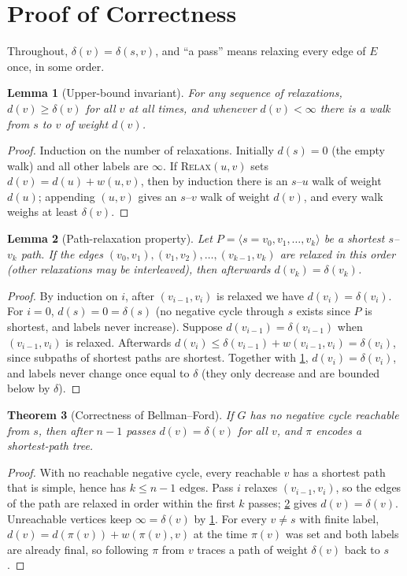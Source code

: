 \documentclass[11pt,a4paper]{article}
\newtheorem{theorem}{Theorem}
\newtheorem{lemma}[theorem]{Lemma}
\theoremstyle{definition}
\newcommand{\dd}{\mathit{d}}
\newcommand{\pred}{\pi}
\begin{document}
\section{Proof of Correctness}
\label{sec:proofs}

Throughout, $\delta(v)=\delta(s,v)$, and ``a pass'' means relaxing every edge of $E$ once, in some order.

\begin{lemma}[Upper-bound invariant]\label{lem:upper}
For any sequence of relaxations, $\dd(v)\ge\delta(v)$ for all $v$ at all times, and whenever $\dd(v)<\infty$ there is a walk from $s$ to $v$ of weight $\dd(v)$.
\end{lemma}
\begin{proof}
Induction on the number of relaxations. Initially $\dd(s)=0$ (the empty walk) and all other labels are $\infty$. If \textsc{Relax}$(u,v)$ sets $\dd(v)=\dd(u)+w(u,v)$, then by induction there is an $s$--$u$ walk of weight $\dd(u)$; appending $(u,v)$ gives an $s$--$v$ walk of weight $\dd(v)$, and every walk weighs at least $\delta(v)$.
\end{proof}

\begin{lemma}[Path-relaxation property]\label{lem:pathrelax}
Let $P=\langle s=v_0,v_1,\dots,v_k\rangle$ be a shortest $s$--$v_k$ path. If the edges $(v_0,v_1),(v_1,v_2),\dots,(v_{k-1},v_k)$ are relaxed in this order (other relaxations may be interleaved), then afterwards $\dd(v_k)=\delta(v_k)$.
\end{lemma}
\begin{proof}
By induction on $i$, after $(v_{i-1},v_i)$ is relaxed we have $\dd(v_i)=\delta(v_i)$. For $i=0$, $\dd(s)=0=\delta(s)$ (no negative cycle through $s$ exists since $P$ is shortest, and labels never increase). Suppose $\dd(v_{i-1})=\delta(v_{i-1})$ when $(v_{i-1},v_i)$ is relaxed. Afterwards $\dd(v_i)\le\delta(v_{i-1})+w(v_{i-1},v_i)=\delta(v_i)$, since subpaths of shortest paths are shortest. Together with \cref{lem:upper}, $\dd(v_i)=\delta(v_i)$, and labels never change once equal to $\delta$ (they only decrease and are bounded below by $\delta$).
\end{proof}

\begin{theorem}[Correctness of Bellman--Ford]\label{thm:bf}
If $G$ has no negative cycle reachable from $s$, then after $n-1$ passes $\dd(v)=\delta(v)$ for all $v$, and $\pred$ encodes a shortest-path tree.
\end{theorem}
\begin{proof}
With no reachable negative cycle, every reachable $v$ has a shortest path that is simple, hence has $k\le n-1$ edges. Pass $i$ relaxes $(v_{i-1},v_i)$, so the edges of the path are relaxed in order within the first $k$ passes; \cref{lem:pathrelax} gives $\dd(v)=\delta(v)$. Unreachable vertices keep $\infty=\delta(v)$ by \cref{lem:upper}. For every $v\neq s$ with finite label, $\dd(v)=\dd(\pred(v))+w(\pred(v),v)$ at the time $\pred(v)$ was set and both labels are already final, so following $\pred$ from $v$ traces a path of weight $\delta(v)$ back to $s$.
\end{proof}
\end{document}
